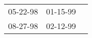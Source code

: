 \begin{supertabular}{lll}
 05-22-98\textsuperscript{} &  01-15-99\textsuperscript{} \\
 08-27-98\textsuperscript{} &  02-12-99\textsuperscript{} \\
\end{supertabular}
